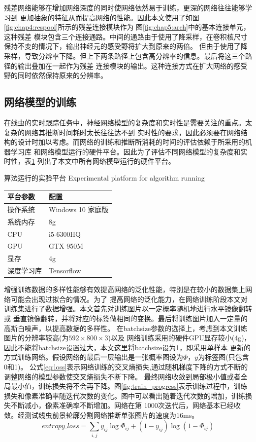 	残差网络\cite{he2016deep}能够在增加网络深度的同时使网络依然易于训练，更深的网络往往能够学习到
	更加抽象的特征从而提高网络的性能。因此本文使用了如图\ref{fig:chap4:respool}所示的残差连接模块\cite{chu2017multi}作为
	图\ref{fig:chap5:arch}中的基本连接单元，这种残差
	模块包含三个连接通路。中间的通路由于使用了降采样，在卷积核尺寸保持不变的情况下，输出神经元的感受野将扩大到原来的两倍。
	但由于使用了降采样，导致分辨率下降。但上下两条路径上包含高分辨率的信息。最后将这三个路径的输出叠加在一起作为残差
	连接模块的输出。这种连接方式在扩大网络的感受野的同时依然保持原来的分辨率。
	
\subsection{网络模型的训练}
	在线虫的实时跟踪任务中，神经网络模型的复杂度和实时性是需要关注的重点。太复杂的网络其推断时间耗时太长往往达不到
	实时性的要求，因此必须要在网络结构的设计时加以考虑。而网络的训练和推断所消耗的时间的评估依赖于所采用的机器学习库
	和网络模型运行的硬件平台。因此为了评估不同网络模型的复杂度和实时性，表\ref{tab:hardwareconfig}
	列出了本文中所有网络模型运行的硬件平台。
	\begin{table}[!hpb]
	\centering
	\bicaption
    {算法运行的实验平台}
    {Experimental platform for algorithm running}
	\label{tab:hardwareconfig}
	\begin{tabular}{p{80pt}p{100pt}}
	\toprule
	平台参数 & 配置 \\
	\midrule
	操作系统 & Windows 10 家庭版\\
	系统内存 & 8g \\
	CPU & i5-6300HQ \\
	GPU & GTX 950M \\
	显存 & 4g \\
	深度学习库 & Tensorflow \\
	\bottomrule
	\end{tabular}
	\end{table}
	
	增强训练数据的多样性能够有效提高网络的泛化性能，特别是在较小的数据集上网络可能会出现过拟合的情况。为了
	提高网络的泛化能力，在网络训练阶段本文对训练集进行了数据增强。本文首先对训练图片以一定概率随机地进行水平镜像翻转或
	垂直镜像翻转，并将对应的标签做相同的变换。最后将训练图片加入一定量的高斯白噪声，以提高数据的多样性。
	在batchsize参数的选择上，考虑到本文训练图片的分辨率较高(为$592\times800\times3$)以及
	网络训练采用的硬件GPU显存较小(4g)，因此不能将batchsize设置过大，本文这里将batchsize设为1，即采用单样本
	更新的方式训练网络。假设网络的最后一层输出是一张概率图设为$\Phi$，$y$为标签图(只包含0和1)。
	公式\ref{eq:loss}表示网络训练的交叉熵损失,通过随机梯度下降的方式不断的调整网络的模型参数使交叉熵损失不断下降。
	最终网络收敛到局部极小值或者全局最小值，训练损失将不会再下降。图\ref{fig:train_progress}表示训练过程中，训练
	损失和像素准确率随迭代次数的变化。图中可以看出随着迭代次数的增加，训练损失不断减小，像素准确率不断增加。网络在第
	1000次迭代后，网络基本已经收敛。经测试线虫前景轮廓分割网络推断单张图片的速度为16ms。
	\begin{equation}
		entropy\_loss = \sum_{i,j}y_{ij}\log \Phi_{ij} + (1-y_{ij})\log (1-\Phi_{ij}) \label{eq:loss}
	\end{equation}
	

